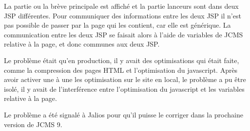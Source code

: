 \documentclass[12pt,a4paper]{article}
\begin{document}
La partie ou la brève principale est affiché et la partie lanceurs sont dans deux JSP différentes. Pour communiquer des informations entre les deux JSP il n'est pas possible de passer par la page qui les contient, car elle est générique. La communication entre les deux JSP se faisait alors à l'aide de variables de JCMS relative à la page, et donc communes aux deux JSP.\par 
Le problème était qu'en production, il y avait des optimisations qui était faite, comme la compression des pages HTML et l'optimisation du javascript. Après avoir activer une à une les optimisation sur le site en local, le problème a pu être isolé, il y avait de l'interférence entre l'optimisation du javascript et les variables relative à la page.\par 
Le problème a été signalé à Jalios pour qu'il puisse le corriger dans la prochaine version de JCMS 9.\par

\newpage
\end{document}
